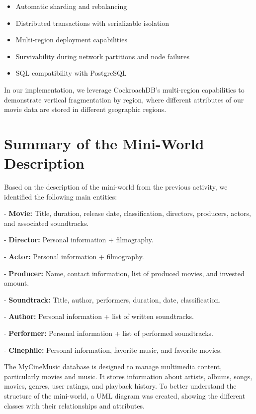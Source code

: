 \documentclass[twoside]{article}
\begin{document}
\begin{itemize}
  \item Automatic sharding and rebalancing
  \item Distributed transactions with serializable isolation
  \item Multi-region deployment capabilities
  \item Survivability during network partitions and node failures
  \item SQL compatibility with PostgreSQL
\end{itemize}

In our implementation, we leverage CockroachDB's multi-region capabilities to demonstrate vertical fragmentation by region, where different attributes of our movie data are stored in different geographic regions.

\section{Summary of the Mini-World Description}
Based on the description of the mini-world from the previous activity, we identified the following main entities:

  
- \textbf{Movie:} Title, duration, release date, classification, directors, producers, actors, and associated soundtracks.
  
- \textbf{Director:} Personal information + filmography.
  
- \textbf{Actor:} Personal information + filmography.
  
- \textbf{Producer:} Name, contact information, list of produced movies, and invested amount.
  
- \textbf{Soundtrack:} Title, author, performers, duration, date, classification.
  
- \textbf{Author:} Personal information + list of written soundtracks.
  
- \textbf{Performer:} Personal information + list of performed soundtracks.
  
- \textbf{Cinephile:} Personal information, favorite music, and favorite movies.


The MyCineMusic database is designed to manage multimedia content, particularly movies and music. It stores information about artists, albums, songs, movies, genres, user ratings, and playback history. To better understand the structure of the mini-world, a UML diagram was created, showing the different classes with their relationships and attributes.
\end{document}
